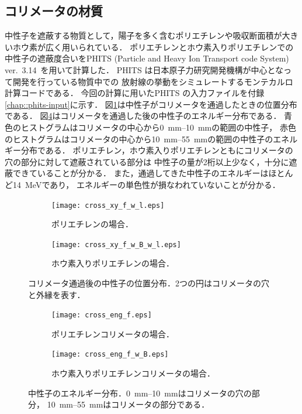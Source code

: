 \documentclass[../master]{subfiles}
\begin{document}
\subsection{コリメータの材質}
中性子を遮蔽する物質として，陽子を多く含むポリエチレンや吸収断面積が大きいホウ素が広く用いられている．
ポリエチレンとホウ素入りポリエチレンでの中性子の遮蔽度合いをPHITS (Particle and Heavy Ion Transport code System)
ver.~3.14~\cite{phits}を用いて計算した．
PHITS は日本原子力研究開発機構が中心となって開発を行っている物質中での
放射線の挙動をシミュレートするモンテカルロ計算コードである．
今回の計算に用いたPHITS の入力ファイルを付録\ref{chap::phits-input}に示す．
図\ref{collimator_xy_pos}は中性子がコリメータを通過したときの位置分布である．
図\ref{fig::neutron_energy}はコリメータを通過した後の中性子のエネルギー分布である．
青色のヒストグラムはコリメータの中心から\SIrange{0}{10}{\milli\metre}の範囲の中性子，
赤色のヒストグラムはコリメータの中心から\SIrange{10}{55}{\milli\metre}の範囲の中性子のエネルギー分布である．
ポリエチレン，ホウ素入りポリエチレンともにコリメータの穴の部分に対して遮蔽されている部分は
中性子の量が2桁以上少なく，十分に遮蔽できていることが分かる．
また，通過してきた中性子のエネルギーはほとんど\SI{14}{\mega\electronvolt}であり，
エネルギーの単色性が損なわれていないことが分かる．
\begin{figure}
  \centering
  \begin{subfigure}{\columnwidth}
    \centering
    \texttt{[image: cross\_xy\_f\_w\_l.eps]}
    \caption{ポリエチレンの場合．}
  \end{subfigure}
  \begin{subfigure}{\columnwidth}
    \centering
    \texttt{[image: cross\_xy\_f\_w\_B\_w\_l.eps]}
    \caption{ホウ素入りポリエチレンの場合．}
  \end{subfigure}
  \caption[コリメータ通過後の中性子の位置分布．]
          {コリメータ通過後の中性子の位置分布．2つの円はコリメータの穴と外縁を表す．}
  \label{collimator_xy_pos}
\end{figure}
\begin{figure}
  \begin{subfigure}{\columnwidth}
    \centering
    \texttt{[image: cross\_eng\_f.eps]}
    \caption{ポリエチレンコリメータの場合．}
    \label{fig::neutron_energy_dist}
  \end{subfigure}
  \begin{subfigure}{\columnwidth}
    \centering
    \texttt{[image: cross\_eng\_f\_w\_B.eps]}
    \caption{ホウ素入りポリエチレンコリメータの場合．}
    \label{fig::neutron_energy_dist_w_B}
  \end{subfigure}
  \caption[中性子のエネルギー分布．]
          {中性子のエネルギー分布．\SIrange{0}{10}{\milli\metre}はコリメータの穴の部分，
          \SIrange{10}{55}{\milli\metre}はコリメータの部分である．}
  \label{fig::neutron_energy}
\end{figure}
\end{document}
